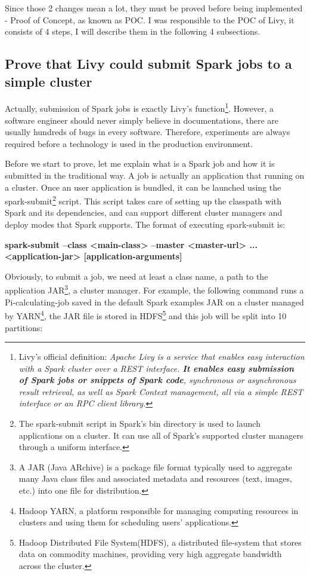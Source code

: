 \documentclass[article,colorback,accentcolor=tud4c]{tudreport}
\begin{document}
Since those 2 changes mean a lot, they must be proved before being implemented - Proof of Concept, as known as POC. I was responsible to  the POC of Livy, it consists of 4 steps, I will describe them in the following 4 subsections.

	\subsection{Prove that Livy could submit Spark jobs to a simple cluster}
	Actually, submission of Spark jobs is exactly Livy's function\footnote{Livy's official definition: \textit{Apache Livy is a service that enables easy interaction with a Spark cluster over a REST interface. \textbf{It enables easy submission of Spark jobs or snippets of Spark code}, synchronous or asynchronous result retrieval, as well as Spark Context management, all via a simple REST interface or an RPC client library.}}. However, a software engineer should never simply believe in documentations, there are usually hundreds of bugs in every software. Therefore, experiments are always required before a technology is used in the production environment.
	
	Before we start to prove, let me explain what is a Spark job and how it is submitted in the traditional way. A job is actually an application that running on a cluster. Once an user application is bundled, it can be launched using the spark-submit\footnote{The spark-submit script in Spark's bin directory is used to launch applications on a cluster. It can use all of Spark’s supported cluster managers through a uniform interface.} script. This script takes care of setting up the classpath with Spark and its dependencies, and can support different cluster managers and deploy modes that Spark supports. The format of executing spark-submit is:
	
	\noindent\textbf{spark-submit --class <main-class> --master <master-url> ... <application-jar> [application-arguments]}
	
	Obviously, to submit a job, we need at least a class name, a path to the application JAR\footnote{A JAR (Java ARchive) is a package file format typically used to aggregate many Java class files and associated metadata and resources (text, images, etc.) into one file for distribution.}, a cluster manager. For example, the following command runs a Pi-calculating-job saved in the default Spark examples JAR on a cluster managed by YARN\footnote{Hadoop YARN, a platform responsible for managing computing resources in clusters and using them for scheduling users' applications.}, the JAR file is stored in HDFS\footnote{Hadoop Distributed File System(HDFS), a distributed file-system that stores data on commodity machines, providing very high aggregate bandwidth across the cluster.} and this job will be split into 10 partitions:
	
\end{document}
